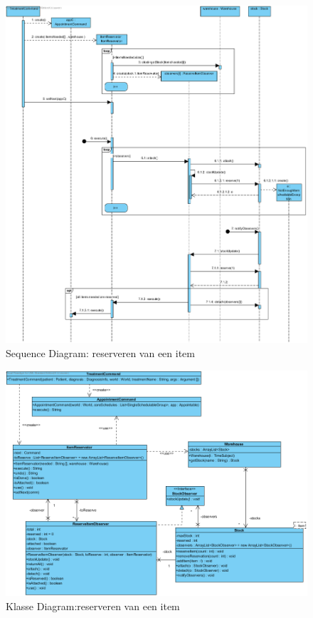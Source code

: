 \documentclass[a4paper]{article}
\begin{document}
\begin{figure}[h]
\centering
\includegraphics[width=\textwidth]{Pictures/Observer}
\caption{Sequence Diagram: reserveren van een item}
\label{fig:SDObserver}
\end{figure}
\begin{figure}[h]
\centering
\includegraphics[width=\textwidth]{Pictures/Warehouse1}
\caption{Klasse Diagram:reserveren van een item}
\label{fig:CDObserver}
\end{figure}
\end{document}
